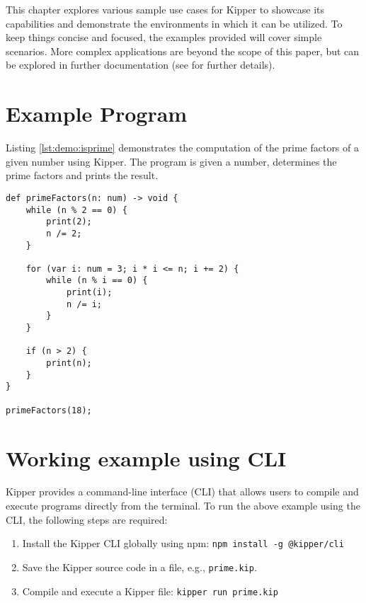
This chapter explores various sample use cases for Kipper to showcase its capabilities and demonstrate the environments in which it can be utilized. To keep things concise and focused, the examples provided will cover simple scenarios. More complex applications are beyond the scope of this paper, but can be explored in further documentation (see  for further details).

\section{Example Program}

Listing \ref{lst:demo:isprime} demonstrates the computation of the prime factors of a given number using Kipper. The program is given a number, determines the prime factors and prints the result.

\begin{lstlisting}[language=Kipper,caption=A basic programs that determines the prime factors of an integer, label=lst:demo:isprime]
def primeFactors(n: num) -> void {
	while (n % 2 == 0) {
		print(2);
		n /= 2;
	}
	
	for (var i: num = 3; i * i <= n; i += 2) {
		while (n % i == 0) {
			print(i);
			n /= i;
		}
	}
	
	if (n > 2) {
		print(n);
	}
}

primeFactors(18);
\end{lstlisting}

\section{Working example using CLI}

Kipper provides a command-line interface (CLI) that allows users to compile and execute programs directly from the terminal. To run the above example using the CLI, the following steps are required:

\begin{enumerate}
	\item Install the Kipper CLI globally using npm: \lstinline|npm install -g @kipper/cli|
	\item Save the Kipper source code in a file, e.g., \texttt{prime.kip}.
	\item Compile and execute a Kipper file: \lstinline|kipper run prime.kip|
\end{enumerate}

